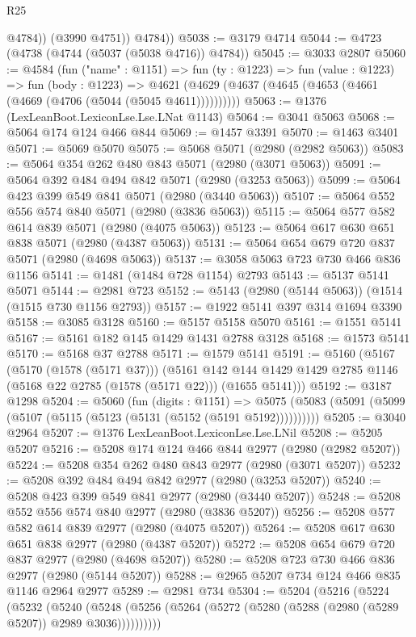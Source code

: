 \begin{lexlean}{R25}
\begin{coremodule}
              @4784))
          (@3990 @4751))
        @4784))
@5038 := @3179 @4714
@5044 := @4723 (@4738 (@4744 (@5037 (@5038 @4716)) @4784))
@5045 := @3033 @2807
@5060 := @4584
    (fun ("name" : @1151) =>
    fun (ty : @1223) =>
    fun (value : @1223) =>
    fun (body : @1223) =>
    @4621 (@4629 (@4637 (@4645 (@4653 (@4661 (@4669 (@4706 (@5044 (@5045 @4611))))))))))
@5063 := @1376 (LexLeanBoot.LexiconLse.Lse.LNat @1143)
@5064 := @3041 @5063
@5068 := @5064 @174 @124 @466 @844
@5069 := @1457 @3391
@5070 := @1463 @3401
@5071 := @5069 @5070
@5075 := @5068 @5071 (@2980 (@2982 @5063))
@5083 := @5064 @354 @262 @480 @843 @5071 (@2980 (@3071 @5063))
@5091 := @5064 @392 @484 @494 @842 @5071 (@2980 (@3253 @5063))
@5099 := @5064 @423 @399 @549 @841 @5071 (@2980 (@3440 @5063))
@5107 := @5064 @552 @556 @574 @840 @5071 (@2980 (@3836 @5063))
@5115 := @5064 @577 @582 @614 @839 @5071 (@2980 (@4075 @5063))
@5123 := @5064 @617 @630 @651 @838 @5071 (@2980 (@4387 @5063))
@5131 := @5064 @654 @679 @720 @837 @5071 (@2980 (@4698 @5063))
@5137 := @3058 @5063 @723 @730 @466 @836 @1156
@5141 := @1481 (@1484 @728 @1154) @2793
@5143 := @5137 @5141 @5071
@5144 := @2981 @723
@5152 := @5143 (@2980 (@5144 @5063)) (@1514 (@1515 @730 @1156 @2793))
@5157 := @1922 @5141 @397 @314 @1694 @3390
@5158 := @3085 @3128
@5160 := @5157 @5158 @5070
@5161 := @1551 @5141
@5167 := @5161 @182 @145 @1429 @1431 @2788 @3128
@5168 := @1573 @5141
@5170 := @5168 @37 @2788
@5171 := @1579 @5141
@5191 := @5160
    (@5167
      (@5170 (@1578 (@5171 @37)))
      (@5161 @142 @144 @1429 @1429 @2785 @1146 (@5168 @22 @2785 (@1578 (@5171 @22))) (@1655 @5141)))
@5192 := @3187 @1298
@5204 := @5060
    (fun (digits : @1151) =>
    @5075 (@5083 (@5091 (@5099 (@5107 (@5115 (@5123 (@5131 (@5152 (@5191 @5192))))))))))
@5205 := @3040 @2964
@5207 := @1376 LexLeanBoot.LexiconLse.Lse.LNil
@5208 := @5205 @5207
@5216 := @5208 @174 @124 @466 @844 @2977 (@2980 (@2982 @5207))
@5224 := @5208 @354 @262 @480 @843 @2977 (@2980 (@3071 @5207))
@5232 := @5208 @392 @484 @494 @842 @2977 (@2980 (@3253 @5207))
@5240 := @5208 @423 @399 @549 @841 @2977 (@2980 (@3440 @5207))
@5248 := @5208 @552 @556 @574 @840 @2977 (@2980 (@3836 @5207))
@5256 := @5208 @577 @582 @614 @839 @2977 (@2980 (@4075 @5207))
@5264 := @5208 @617 @630 @651 @838 @2977 (@2980 (@4387 @5207))
@5272 := @5208 @654 @679 @720 @837 @2977 (@2980 (@4698 @5207))
@5280 := @5208 @723 @730 @466 @836 @2977 (@2980 (@5144 @5207))
@5288 := @2965 @5207 @734 @124 @466 @835 @1146 @2964 @2977
@5289 := @2981 @734
@5304 := @5204
    (@5216
      (@5224
        (@5232
          (@5240
            (@5248 (@5256 (@5264 (@5272 (@5280 (@5288 (@2980 (@5289 @5207)) @2989 @3036))))))))))

\end{coremodule}
\end{lexlean}
